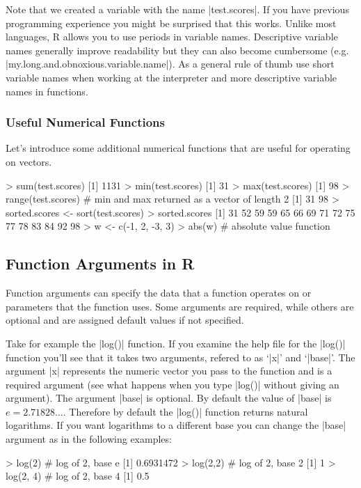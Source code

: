 Note that we created a variable with the name |test.scores|.
If you have previous programming experience you might be surprised that
this works. Unlike most languages, R allows you to use periods in
variable names. Descriptive variable names generally improve readability
but they can also become cumbersome (e.g.
|my.long.and.obnoxious.variable.name|). As a general rule of
thumb use short variable names when working at the interpreter and more
descriptive variable names in functions.

\subsubsection{Useful Numerical Functions}

Let's introduce some additional numerical functions that are useful for
operating on vectors.
%
\begin{R}
> sum(test.scores)
[1] 1131
> min(test.scores)
[1] 31
> max(test.scores)
[1] 98
> range(test.scores) # min and max returned as a vector of length 2
[1] 31 98
> sorted.scores <- sort(test.scores)
> sorted.scores
 [1] 31 52 59 59 65 66 69 71 72 75 77 78 83 84 92 98
> w <- c(-1, 2, -3, 3)
> abs(w) # absolute value function
\end{R}


\subsection{Function Arguments in R}

Function arguments can specify the data that a function operates on or
parameters that the function uses. Some arguments are required, while
others are optional and are assigned default values if not specified.

Take for example the |log()| function. If you examine the help
file for the |log()| function you'll see that it takes two
arguments, refered to as `|x|' and `|base|'. The
argument |x| represents the numeric vector you pass to the
function and is a required argument (see what happens when you type
|log()| without giving an argument). The argument
|base| is optional. By default the value of |base|
is $e = 2.71828\ldots$. Therefore by default the |log()|
function returns natural logarithms. If you want logarithms to a
different base you can change the |base| argument as in the
following examples:
%
\begin{R}
> log(2) # log of 2, base e
[1] 0.6931472
> log(2,2) # log of 2, base 2
[1] 1
> log(2, 4) # log of 2, base 4
[1] 0.5
\end{R}



